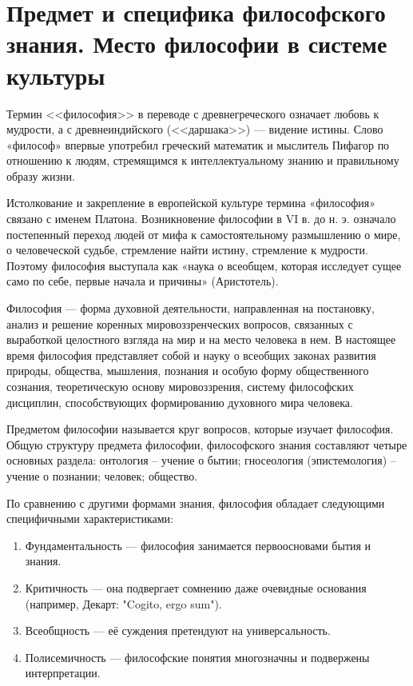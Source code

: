 \section{Предмет и специфика философского знания. Место философии в системе культуры}
Термин <<философия>> в переводе с древнегреческого означает любовь к мудрости, а с древ­неиндийского (<<даршака>>) — видение истины. Слово «философ» впервые употребил греческий математик и мыс­литель Пифагор по отношению к людям, стре­мящимся к интеллектуальному знанию и правильному образу жизни. 
\par Истолкование и закрепление в европейской культуре термина «фи­лософия» связано с именем Платона. Возникновение философии в VI в. до н. э. означало постепенный переход людей от мифа к самостоятельному размышлению о мире, о челове­ческой судьбе, стремление найти истину, стремление к мудрости. Поэтому философия выступала как «наука о всеобщем, которая исследует сущее само по себе, первые начала и причины» (Аристотель). 
\par  Философия — форма духовной деятельности, направленная на по­становку, анализ и решение коренных мировоззренческих вопросов, связанных с выработкой целостного взгляда на мир и на место чело­века в нем. В настоящее время философия представляет собой и науку о все­общих законах развития природы, общества, мышления, познания и особую форму общественного сознания, теоретическую основу ми­ровоззрения, систему философских дисциплин, способствующих фор­мированию духовного мира человека. 
\par Предметом философии называется круг вопросов, которые изуча­ет философия. Общую структуру предмета философии, философско­го знания составляют четыре основных раздела: онтология -- учение о бытии; гносеология (эпистемология) -- учение о познании; человек; общество.
\par По сравнению с другими формами знания, философия обладает следующими специфичными характеристиками:
\begin{enumerate}
	\item Фундаментальность — философия занимается первоосновами бытия и знания.
	\item Критичность — она подвергает сомнению даже очевидные основания (например, Декарт: "Cogito, ergo sum").
	\item Всеобщность — её суждения претендуют на универсальность.
	\item Полисемичность — философские понятия многозначны и подвержены интерпретации.
\end{enumerate}
